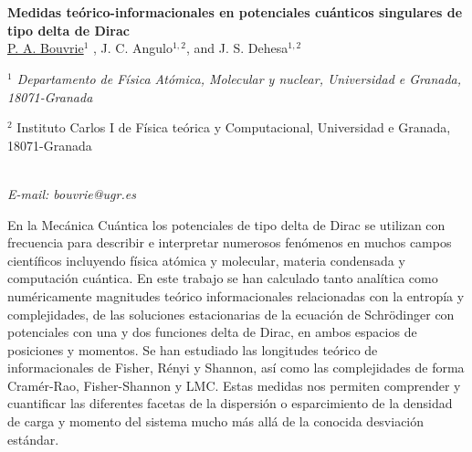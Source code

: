 \section*{}
\begin{center}
{\bf \Large
Medidas teórico-informacionales en potenciales cuánticos singulares de tipo
delta de Dirac}
\\
\vspace{0.5cm}
\underline{P. A. Bouvrie}$^{1}$ , J. C. Angulo$^{1,2}$, and J. S. Dehesa$^{1,2}$
\\
\vspace{0.5cm}
{\it 
$^{1}$ Departamento de Física Atómica, Molecular y nuclear, Universidad e Granada, 18071-Granada

$^{2}$ Instituto Carlos I de Física teórica y Computacional, Universidad e Granada, 18071-Granada
}
\\
\vspace{0.5cm}
{\it E-mail: bouvrie@ugr.es}
\\
\vspace{0.5cm}
\end{center}
En la Mecánica Cuántica los potenciales de tipo delta de Dirac se utilizan con frecuencia
para describir e interpretar numerosos fenómenos en muchos
campos científicos incluyendo física
atómica y molecular, materia condensada y computación cuántica. En este trabajo se han calculado tanto analítica como numéricamente magnitudes teórico informacionales relacionadas con la entropía y complejidades, de las soluciones estacionarias de la ecuación de Schrödinger con potenciales con una y dos funciones delta de Dirac, en ambos espacios de posiciones y momentos. Se han estudiado las longitudes teórico de informacionales de Fisher, Rényi y Shannon, así como las complejidades de forma Cramér-Rao, Fisher-Shannon y LMC.
Estas medidas nos permiten comprender y cuantificar las diferentes
facetas de la dispersión o esparcimiento de la densidad de carga
y momento del sistema mucho más allá de la conocida desviación estándar.

\newpage
\setcounter{figure}{0}
